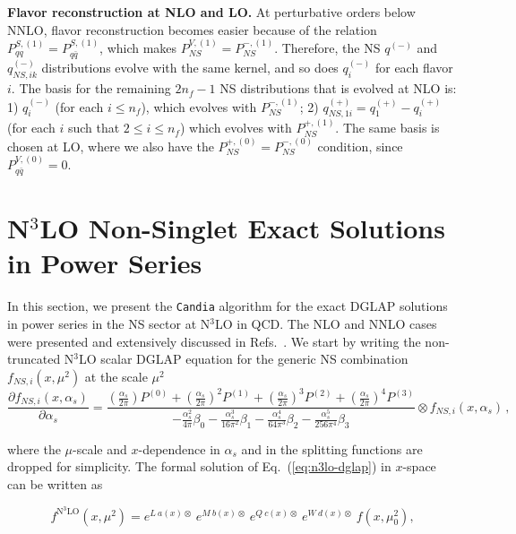 \documentclass[12pt,notitlepage,aps,preprintnumbers,superscriptaddress,nofootinbib,aps,prd,floatfix]{revtex4-2}
\newcommand{\ddp}{\partial}
\begin{document}
{\bf Flavor reconstruction at NLO and LO.} At perturbative orders below NNLO, flavor reconstruction becomes easier because of the relation $P_{qq}^{S,(1)}=P_{q\bar{q}}^{S,(1)}$, which makes $P_{NS}^{V,(1)}=P_{NS}^{-,(1)}$.
Therefore, the NS $q^{(-)}$ and $q_{NS,ik}^{(-)}$ distributions evolve with
the same kernel, and so does $q_{i}^{(-)}$ for each flavor $i$. The basis for the remaining $2n_{f}-1$ NS distributions that is evolved at NLO is: 1) $q_{i}^{(-)}$ (for each $i\leq n_{f}$), which evolves with $P_{NS}^{-,(1)}$; 
2) $q_{NS,1i}^{(+)}=q_{1}^{(+)}-q_{i}^{(+)}$ (for each $i$ such that
$2\leq i\leq n_{f}$) which evolves with $P_{NS}^{+,(1)}$. The same basis is chosen at LO, where we also have the $P_{NS}^{+,(0)}=P_{NS}^{-,(0)}$ condition, 
since $P_{q\bar{q}}^{V,(0)}=0$.






\section{N$^3$LO Non-Singlet Exact Solutions in Power Series}
\label{NS-solutions}

In this section, we present the \texttt{Candia} algorithm for the exact DGLAP solutions in power series in the NS sector at N$^3$LO in QCD. The NLO and NNLO cases were presented and extensively discussed in Refs.~\cite{Cafarella:2005zj,Cafarella:2008du,Guzzi:2006wx}. We start by writing the non-truncated N$^3$LO scalar DGLAP equation for the generic NS combination $f_{NS,i}(x,\mu^2)$ at the scale $\mu^2$
%
\begin{equation}
\frac{\ddp{f_{NS,i}(x,\alpha_s)}}{\ddp{\alpha_s}} = \frac{\left( \frac{\alpha_s}{2\pi} \right)P^{(0)} + \left( \frac{\alpha_s}{2\pi} \right)^2 P^{(1)} + \left( \frac{\alpha_s}{2\pi} \right)^3 P^{(2)} + \left( \frac{\alpha_s}{2\pi} \right)^4 P^{(3)}}{- \frac{\alpha_s^2}{4\pi}\beta_0 - \frac{\alpha_s^3}{16\pi^2}\beta_1 - \frac{\alpha_s^4}{64\pi^3}\beta_2 - \frac{\alpha_s^5}{256\pi^4}\beta_3}\otimes f_{NS,i}(x,\alpha_s)\,,
\label{eq:n3lo-dglap}
\end{equation}

where the $\mu$-scale and $x$-dependence in $\alpha_s$ and in the splitting functions are  dropped for simplicity. The formal solution of Eq.~(\ref{eq:n3lo-dglap}) in $x$-space can be written as 

\begin{equation}
f^{\textrm{N}^3\textrm{LO}}(x,\mu^2) = e^{L~ a(x)\otimes} ~e^{M~ b(x)\otimes}~ e^{Q~ c(x)\otimes} ~ e^{W ~d(x)\otimes}~ f(x,\mu_0^2),
\label{formal-sol}
\end{equation}
\end{document}
